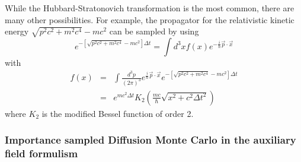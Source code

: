  While the Hubbard-Stratonovich transformation is the most common, there are
 many other possibilities. For example, the propagator for the
 relativistic kinetic energy
 $\sqrt{p^2 c^2 + m^2 c^4}-mc^2$ can be sampled by using
 \begin{equation}
 e^{-\left [\sqrt{p^2 c^2 + m^2 c^4}-mc^2 \right ] \Delta t} =
 \int d^3x f(x) e^{-\frac{i}{\hbar} \vec p \cdot \vec x}
 \end{equation}
 with
 \begin{eqnarray}
 f(x) &=& \int \frac{d^3p}{(2\pi)^3} e^{\frac{i}{\hbar} \vec p \cdot \vec x}
 e^{-\left [\sqrt{p^2 c^2 + m^2 c^4}-mc^2 \right ] \Delta t}
 \nonumber\\
 &=& e^{mc^2 \Delta t}
 K_2 \left ( \frac{m c}{\hbar} \sqrt{x^2+c^2 \Delta t^2} \right )
 \end{eqnarray}
 where $K_2$ is the modified Bessel function of order 2\cite{carlson1993}.
 
 
 \subsubsection{Importance sampled Diffusion Monte Carlo in the auxiliary field
 	formulism}
 
